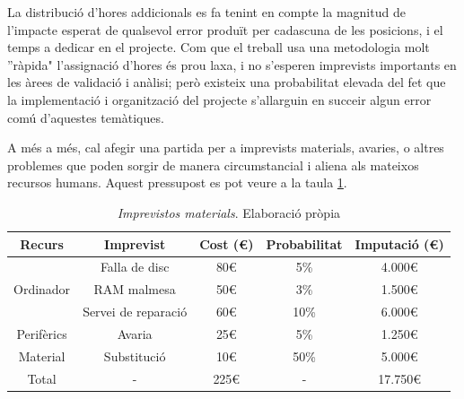 \documentclass[a4paper]{article} %
\begin{document}
	La distribució d'hores addicionals es fa tenint en compte la magnitud de l'impacte esperat de qualsevol error produït per cadascuna de les posicions, i el temps a dedicar en el projecte. Com que el treball usa una metodologia molt ''ràpida"  l'assignació d'hores és prou laxa, i no s'esperen imprevists importants en les àrees de validació i anàlisi; però existeix una probabilitat elevada del fet que la implementació i organització del projecte s'allarguin en succeir algun error comú d'aquestes temàtiques.
	\par 
	A més a més, cal afegir una partida per a imprevists materials, avaries, o altres problemes que poden sorgir de manera circumstancial i aliena als mateixos recursos humans. Aquest pressupost es pot veure  a la taula \ref{table:imprevistosM}.
	\begin{table}[h!]
		\centering
		\begin{tabular}{|| c || c | c || c | c ||}
			\hline
			\textbf{Recurs} & \textbf{Imprevist} & \textbf{Cost (\euro)} & \textbf{Probabilitat} & \textbf{Imputació (\euro)} \\
			\hline\hline
			\multirow{3}{*}{Ordinador} & 
					Falla de disc & 80\euro & 5\% & 4.000\euro \\
					&RAM malmesa  &  50\euro & 3\% & 1.500\euro \\
					&Servei de reparació 	 & 60\euro & 10\% & 6.000\euro \\
			\hline 
			Perifèrics & Avaria & 25\euro & 5\% & 1.250\euro\\
			\hline
			Material & Substitució & 10\euro & 50\% & 5.000\euro \\
			\hline \hline
			Total & - & 225\euro & - & 17.750\euro\\
			\hline
		\end{tabular}
		\caption[\textit{Imprevistos materials}]{\textit{\small Imprevistos materials}. Elaboració pròpia}
		\label{table:imprevistosM}
	\end{table}
	
\end{document}
